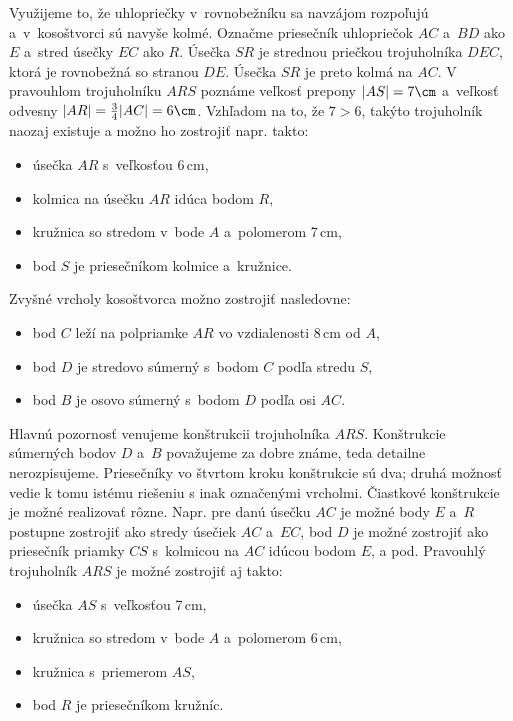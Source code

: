 {%
Využijeme to, že uhlopriečky v~rovnobežníku sa navzájom rozpoľujú a~v~kosoštvorci sú navyše kolmé.
Označme priesečník uhlopriečok $AC$ a~$BD$ ako $E$ a~stred úsečky $EC$ ako $R$.
Úsečka $SR$ je strednou priečkou trojuholníka $DEC$, ktorá je rovnobežná so stranou $DE$.
Úsečka $SR$ je preto kolmá na $AC$.
V pravouhlom trojuholníku $ARS$ poznáme veľkosť prepony $|AS|=7\cm$ a~veľkosť odvesny $|AR|=\frac34|AC|=6\cm$.
Vzhľadom na to, že $7>6$, takýto trojuholník naozaj existuje a možno ho zostrojiť napr. takto:
\begin{itemize}
\item úsečka $AR$ s~veľkosťou 6\,cm,
\item kolmica na úsečku $AR$ idúca bodom $R$,
\item kružnica so stredom v~bode $A$ a~polomerom 7\,cm,
\item bod $S$ je priesečníkom kolmice a~kružnice.
\end{itemize}
\noindent
Zvyšné vrcholy kosoštvorca možno zostrojiť nasledovne:
\begin{itemize}
\item bod $C$ leží na polpriamke $AR$ vo vzdialenosti 8\,cm od $A$,
\item bod $D$ je stredovo súmerný s~bodom $C$ podľa stredu $S$,
\item bod $B$ je osovo súmerný s~bodom $D$ podľa osi $AC$.
%
\end{itemize}

\poznamky
Hlavnú pozornosť venujeme konštrukcii trojuholníka $ARS$.
Konštrukcie súmerných bodov $D$ a~$B$ považujeme za dobre známe, teda detailne nerozpisujeme.
Priesečníky vo štvrtom kroku konštrukcie sú dva;
druhá možnosť vedie k tomu istému riešeniu s inak označenými vrcholmi.
Čiastkové konštrukcie je možné realizovať rôzne.
Napr. pre danú úsečku $AC$ je možné body $E$ a~$R$ postupne zostrojiť ako stredy úsečiek $AC$ a~$EC$,
bod $D$ je možné zostrojiť ako priesečník priamky $CS$ s~kolmicou na $AC$ idúcou bodom $E$,
a pod.
Pravouhlý trojuholník $ARS$ je možné zostrojiť aj takto:
\begin{itemize}
\item úsečka $AS$ s~veľkosťou 7\,cm,
\item kružnica so stredom v~bode $A$ a~polomerom 6\,cm,
\item kružnica s~priemerom $AS$,
\item bod $R$ je priesečníkom kružníc.
%
\end{itemize}

}

